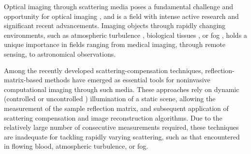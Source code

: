 \documentclass[pdflatex,sn-mathphys-num]{sn-jnl}%
\theoremstyle{thmstyleone}%
\theoremstyle{thmstyletwo}%
\theoremstyle{thmstylethree}%
\begin{document}
Optical imaging through scattering media poses a fundamental challenge and opportunity for optical imaging \cite{yoon2020deep,bertolotti2022imaging}, and is a field with intense active research and significant recent advancements. 
Imaging objects through rapidly changing environments, such as atmospheric turbulence \cite{mao2022single,cai2023convrt,zhang2024imaging}, biological tissues \cite{jang2015relation,horstmeyer2015guidestar}, or fog \cite{satat2018towards}, holds a unique importance in fields ranging from medical imaging, through remote sensing, to astronomical observations.

Among the recently developed scattering-compensation techniques, reflection-matrix-based methods have emerged as essential tools for noninvasive computational imaging through such media. These approaches rely on dynamic (controlled \cite{kang17,badon2020distortion,zhang2023deep,lim2024multiphoton} or uncontrolled \cite{lee22,weinberg2023noninvasive,sunray2024beyond}) illumination of a static scene, allowing the measurement of the sample reflection matrix, and subsequent application of scattering compensation and image reconstruction algorithms. Due to the relatively large number of consecutive measurements required, these techniques are inadequate for tackling rapidly varying scattering, such as that encountered in flowing blood, atmospheric turbulence, or fog.
\end{document}
